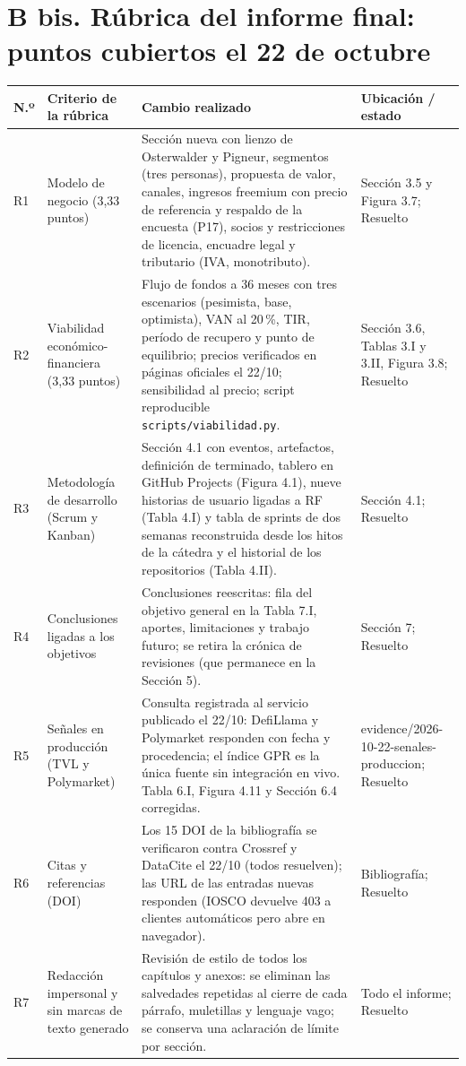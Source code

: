 \documentclass[a4paper,11pt]{article}
\newcommand{\ok}{\textcolor{green!45!black}{Resuelto}}
\begin{document}
\section*{B bis. Rúbrica del informe final: puntos cubiertos el 22 de octubre}
\begin{longtable}{>{\raggedright\arraybackslash}p{0.6cm}>{\raggedright\arraybackslash}p{4.6cm}>{\raggedright\arraybackslash}p{8.0cm}>{\raggedright\arraybackslash}p{3.3cm}}
\toprule
\textbf{N.º} & \textbf{Criterio de la rúbrica} & \textbf{Cambio realizado} & \textbf{Ubicación / estado}\\\midrule
\endhead
R1 & Modelo de negocio (3,33 puntos) & Sección nueva con lienzo de Osterwalder y Pigneur, segmentos (tres personas), propuesta de valor, canales, ingresos freemium con precio de referencia y respaldo de la encuesta (P17), socios y restricciones de licencia, encuadre legal y tributario (IVA, monotributo). & Sección 3.5 y Figura 3.7; \ok\\
R2 & Viabilidad económico-financiera (3,33 puntos) & Flujo de fondos a 36 meses con tres escenarios (pesimista, base, optimista), VAN al 20\,\%, TIR, período de recupero y punto de equilibrio; precios verificados en páginas oficiales el 22/10; sensibilidad al precio; script reproducible \texttt{scripts/viabilidad.py}. & Sección 3.6, Tablas 3.I y 3.II, Figura 3.8; \ok\\
R3 & Metodología de desarrollo (Scrum y Kanban) & Sección 4.1 con eventos, artefactos, definición de terminado, tablero en GitHub Projects (Figura 4.1), nueve historias de usuario ligadas a RF (Tabla 4.I) y tabla de sprints de dos semanas reconstruida desde los hitos de la cátedra y el historial de los repositorios (Tabla 4.II). & Sección 4.1; \ok\\
R4 & Conclusiones ligadas a los objetivos & Conclusiones reescritas: fila del objetivo general en la Tabla 7.I, aportes, limitaciones y trabajo futuro; se retira la crónica de revisiones (que permanece en la Sección 5). & Sección 7; \ok\\
R5 & Señales en producción (TVL y Polymarket) & Consulta registrada al servicio publicado el 22/10: DefiLlama y Polymarket responden con fecha y procedencia; el índice GPR es la única fuente sin integración en vivo. Tabla 6.I, Figura 4.11 y Sección 6.4 corregidas. & evidence/2026-10-22-senales-produccion; \ok\\
R6 & Citas y referencias (DOI) & Los 15 DOI de la bibliografía se verificaron contra Crossref y DataCite el 22/10 (todos resuelven); las URL de las entradas nuevas responden (IOSCO devuelve 403 a clientes automáticos pero abre en navegador). & Bibliografía; \ok\\
R7 & Redacción impersonal y sin marcas de texto generado & Revisión de estilo de todos los capítulos y anexos: se eliminan las salvedades repetidas al cierre de cada párrafo, muletillas y lenguaje vago; se conserva una aclaración de límite por sección. & Todo el informe; \ok\\
\bottomrule
\end{longtable}
\end{document}
